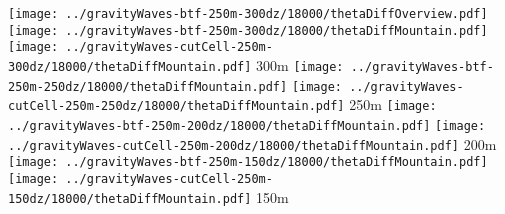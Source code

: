 \documentclass{article}
\begin{document}
\centering
\texttt{[image: ../gravityWaves-btf-250m-300dz/18000/thetaDiffOverview.pdf]}
\vspace*{0.1in}
\texttt{[image: ../gravityWaves-btf-250m-300dz/18000/thetaDiffMountain.pdf]}
\texttt{[image: ../gravityWaves-cutCell-250m-300dz/18000/thetaDiffMountain.pdf]}
300m
\vspace*{0.1in}
\texttt{[image: ../gravityWaves-btf-250m-250dz/18000/thetaDiffMountain.pdf]}
\texttt{[image: ../gravityWaves-cutCell-250m-250dz/18000/thetaDiffMountain.pdf]}
250m
\vspace*{0.1in}
\texttt{[image: ../gravityWaves-btf-250m-200dz/18000/thetaDiffMountain.pdf]}
\texttt{[image: ../gravityWaves-cutCell-250m-200dz/18000/thetaDiffMountain.pdf]}
200m
\vspace*{0.1in}
\texttt{[image: ../gravityWaves-btf-250m-150dz/18000/thetaDiffMountain.pdf]}
\texttt{[image: ../gravityWaves-cutCell-250m-150dz/18000/thetaDiffMountain.pdf]}
150m
\vspace*{0.1in}
\end{document}
